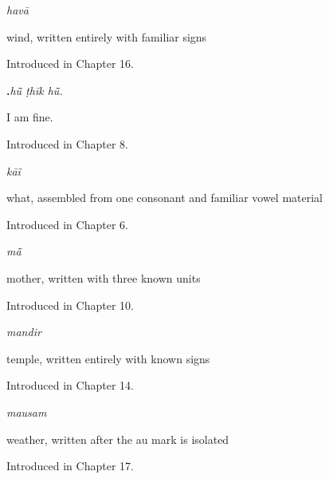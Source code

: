 \noindent\begin{minipage}[t]{\linewidth}
\raggedright
\textbf{}\enspace\emph{havā}\par
\small wind, written entirely with familiar signs\par
\footnotesize Introduced in Chapter 16.
\end{minipage}\par\medskip

\noindent\begin{minipage}[t]{\linewidth}
\raggedright
\textbf{  .}\enspace\emph{hū̃ ṭhīk hū̃.}\par
\small I am fine.\par
\footnotesize Introduced in Chapter 8.
\end{minipage}\par\medskip

\noindent\begin{minipage}[t]{\linewidth}
\raggedright
\textbf{}\enspace\emph{kāĩ}\par
\small what, assembled from one consonant and familiar vowel material\par
\footnotesize Introduced in Chapter 6.
\end{minipage}\par\medskip

\noindent\begin{minipage}[t]{\linewidth}
\raggedright
\textbf{}\enspace\emph{mā̃}\par
\small mother, written with three known units\par
\footnotesize Introduced in Chapter 10.
\end{minipage}\par\medskip

\noindent\begin{minipage}[t]{\linewidth}
\raggedright
\textbf{}\enspace\emph{mandir}\par
\small temple, written entirely with known signs\par
\footnotesize Introduced in Chapter 14.
\end{minipage}\par\medskip

\noindent\begin{minipage}[t]{\linewidth}
\raggedright
\textbf{}\enspace\emph{mausam}\par
\small weather, written after the au mark is isolated\par
\footnotesize Introduced in Chapter 17.
\end{minipage}\par\medskip

